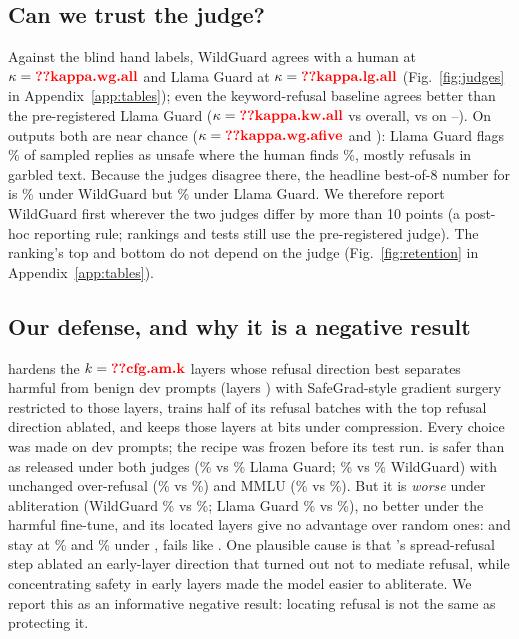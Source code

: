 \subsection{Can we trust the judge?}
\label{sec:judges}
Against the blind hand labels, WildGuard agrees with a human at $\kappa=\V{kappa.wg.all}$ and Llama Guard at
$\kappa=\V{kappa.lg.all}$ (Fig.~\ref{fig:judges} in Appendix~\ref{app:tables}); even the keyword-refusal baseline agrees better than the
pre-registered Llama Guard ($\kappa=\V{kappa.kw.all}$ vs  overall,  vs
 on --). On  outputs both are near chance
($\kappa=\V{kappa.wg.afive}$ and ): Llama Guard flags \% of sampled 
replies as unsafe where the human finds \%, mostly refusals in garbled text. Because the
judges disagree there, the headline best-of-8 number for  is \% under WildGuard but
\% under Llama Guard. We therefore report WildGuard first wherever the two judges differ by more than
10 points (a post-hoc reporting rule; rankings and tests still use the pre-registered judge). The ranking's top and
bottom do not depend on the judge (Fig.~\ref{fig:retention} in Appendix~\ref{app:tables}).

\subsection{Our defense, and why it is a negative result}
\label{sec:defense}
 hardens the $k=\V{cfg.am.k}$ layers whose refusal direction best separates harmful from benign dev prompts
(layers ) with SafeGrad-style gradient surgery \citetext{\citealp{yi2025safegrad}; implemented with SafeTune, \citealp{seth2026safetuneunifiedfaithfullibrary}} restricted to those layers, trains half of its refusal
batches with the top refusal direction ablated, and keeps those layers at  bits under compression.
Every choice was made on dev prompts; the recipe was frozen before its test run.  is safer than  as
released under both judges (\% vs \% Llama Guard; \% vs \%
WildGuard) with unchanged over-refusal (\% vs \%) and MMLU (\% vs
\%). But it is \emph{worse} under abliteration (WildGuard \% vs \%; Llama
Guard \% vs \%), no better under the harmful fine-tune, and its located layers give no
advantage over random ones:  and  stay at \% and \%
under ,  fails like . One plausible cause is that 's spread-refusal step
ablated an early-layer direction that turned out not to mediate refusal, while concentrating safety in early layers
made the model easier to abliterate. We report this as an informative negative result: locating refusal is not the
same as protecting it.


